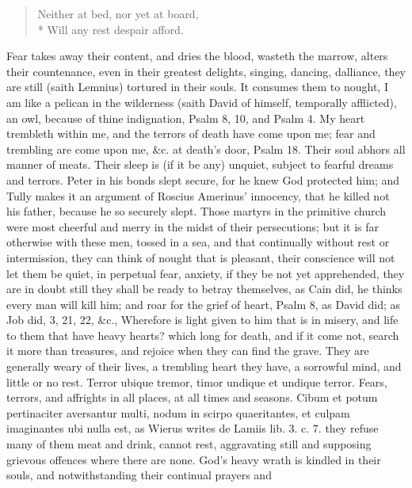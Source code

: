 {\begin{verse}
Neither at bed, nor yet at board,\\*
Will any rest despair afford.
\end{verse}

Fear takes away their content, and dries the blood, wasteth the marrow,
alters their countenance, even in their greatest delights, singing,
dancing, dalliance, they are still (saith Lemnius) tortured in
their souls. It consumes them to nought, I am like a pelican in the
wilderness (saith David of himself, temporally afflicted), an owl,
because of thine indignation, Psalm  8, 10, and Psalm  4. My
heart trembleth within me, and the terrors of death have come upon me;
fear and trembling are come upon me, \&c. at death's door, Psalm 
18. Their soul abhors all manner of meats. Their sleep is (if it
be any) unquiet, subject to fearful dreams and terrors. Peter in his
bonds slept secure, for he knew God protected him; and Tully makes it
an argument of Roscius Amerinus' innocency, that he killed not his
father, because he so securely slept. Those martyrs in the primitive
church were most cheerful and merry in the midst of their
persecutions; but it is far otherwise with these men, tossed in a sea,
and that continually without rest or intermission, they can think of
nought that is pleasant, their conscience will not let them be
quiet, in perpetual fear, anxiety, if they be not yet apprehended, they
are in doubt still they shall be ready to betray themselves, as Cain
did, he thinks every man will kill him; and roar for the grief of
heart, Psalm  8, as David did; as Job did,  3, 21, 22, \&c.,
Wherefore is light given to him that is in misery, and life to them
that have heavy hearts? which long for death, and if it come not,
search it more than treasures, and rejoice when they can find the
grave. They are generally weary of their lives, a trembling heart they
have, a sorrowful mind, and little or no rest. Terror ubique tremor,
timor undique et undique terror. Fears, terrors, and affrights in all
places, at all times and seasons. Cibum et potum pertinaciter
aversantur multi, nodum in scirpo quaeritantes, et culpam imaginantes
ubi nulla est, as Wierus writes de Lamiis lib. 3. c. 7. they refuse
many of them meat and drink, cannot rest, aggravating still and
supposing grievous offences where there are none. God's heavy wrath is
kindled in their souls, and notwithstanding their continual prayers and
}

